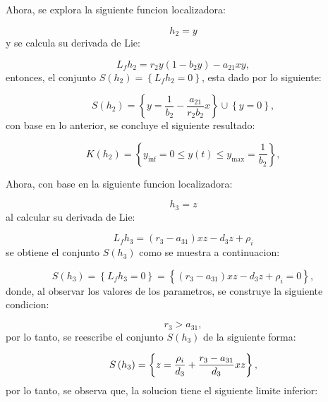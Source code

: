 \documentclass[letterpaper,11pt]{article}
\begin{document}
\bigskip 

Ahora, se explora la siguiente funcion localizadora:

\begin{equation*}
h_{2}=y
\end{equation*}%
y se calcula su derivada de Lie:

\begin{equation*}
L_{f}h_{2}=r_{2}y(1-b_{2}y)-a_{21}xy,
\end{equation*}%
entonces, el conjunto $S\left( h_{2}\right) =\left\{ L_{f}h_{2}=0\right\} $,
esta dado por lo siguiente:

\begin{equation*}
S(h_{2})=\left\{ y=\frac{1}{b_{2}}-\frac{a_{21}}{r_{2}b_{2}}x\right\} \cup
\left\{ y=0\right\} ,
\end{equation*}%
con base en lo anterior, se concluye el siguiente resultado:

\begin{equation*}
K\left( h_{2}\right) =\left\{ y_{\inf }=0\leq y\left( t\right) \leq y_{\max
}=\frac{1}{b_{2}}\right\} ,
\end{equation*}

Ahora, con base en la siguiente funcion localizadora:

\begin{equation*}
h_{3}=z
\end{equation*}%
al calcular su derivada de Lie:

\begin{equation*}
L_{f}h_{3}=(r_{3}-a_{31})xz-d_{3}z+\rho _{i}
\end{equation*}%
se obtiene el conjunto $S\left( h_{3}\right) $ como se muestra a
continuacion:

\begin{equation*}
S\left( h_{3}\right) =\left\{ L_{f}h_{3}=0\right\} =\left\{ \left(
r_{3}-a_{31}\right) xz-d_{3}z+\rho _{i}=0\right\} ,
\end{equation*}%
donde, al observar los valores de los parametros, se construye la siguiente
condicion:

\begin{equation*}
r_{3}>a_{31},
\end{equation*}%
por lo tanto, se reescribe el conjunto $S\left( h_{3}\right) $ de la
siguiente forma:

\begin{equation*}
S\left( h_{3}\right) =\left\{ z=\frac{\rho _{i}}{d_{3}}+\frac{r_{3}-a_{31}}{%
d_{3}}xz\right\} ,
\end{equation*}%
por lo tanto, se observa que, la solucion tiene el siguiente limite inferior:
\end{document}

